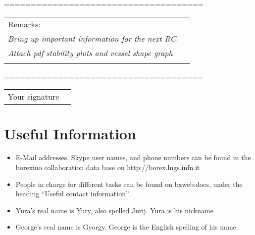 \documentclass[a4paper,10pt]{article}
\begin{document}
=====================================

\begin{tabular}{lr}
\underline{Remarks:}  &\\*
\textit{Bring up important information for the next RC.} &\\
\textit{Attach pdf stability plots and vessel shape graph} &\\ \\
\end{tabular}

=====================================  \\

\begin{tabular}{lr}
Your signature  &\\
\end{tabular}

\newpage
\section{Useful Information}
\begin{itemize}
\item E-Mail addresses, Skype user names, and phone numbers can be found in the borexino collaboration data base on http://borex.lngs.infn.it
\item People in charge for different tasks can be found on bxweb:docs, under the heading ``Useful contact information''
\item Yura's real name is Yury, also spelled Jurij. Yura is his nickname
\item George's real name is Gyorgy. George is the English spelling of his name
\end{itemize}
\end{document}
